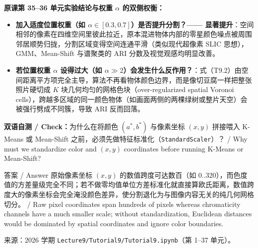 \textbf{原课第 35–36 单元实验结论与权重 $\alpha$ 的双侧权衡：}
\begin{itemize}
\item \textbf{加入适度位置权重（如 $\alpha \in [0.3, 0.7]$）是否提升分割？—— 显著提升}：空间相邻的像素在四维空间里彼此拉近，原本混进物体内部的零星颜色噪点被周围邻居顺势归拢，分割区域变得空间连通平滑（类似现代超像素 SLIC 思想），GMM、Mean-Shift 与谱聚类的 ARI 分数及视觉观感均明显改善。
\item \textbf{若位置权重 $\alpha$ 设得过大（如 $\alpha \gg 2$）会发生什么反作用？}：式（T9.2）由空间距离平方项完全主导，算法不再看物体颜色边界，而是像切豆腐一样把整张照片硬切成 $K$ 块几何均匀的网格色块（over-regularized spatial Voronoi cells），跨越多区域的同一颜色物体（如画面两侧的两棵绿树或整片天空）会被强行劈成不同簇，导致 ARI 反而回落。
\end{itemize}

\textbf{双语自测 / Check：}为什么在将颜色 $(a^*, b^*)$ 与像素坐标 $(x, y)$ 拼接喂入 K-Means 或 Mean-Shift 之前，必须先做特征标准化（\texttt{StandardScaler}）？ / Why must we standardize color and $(x,y)$ coordinates before running K-Means or Mean-Shift?

\begin{StudySolution}{答案 / Answer}
原始像素坐标 $(x, y)$ 的数值跨度可达数百（如 $0..320$），而色度值的方差量级完全不同；若不做零均值单位方差标准化就直接算欧氏距离，数值跨度大的像素坐标会完全淹没颜色差异，使分割退化为与图像内容无关的纯几何网格切分。 / Raw pixel coordinates span hundreds of pixels whereas chromaticity channels have a much smaller scale; without standardization, Euclidean distances would be dominated by spatial coordinates and ignore color boundaries.
\end{StudySolution}

来源：2026 学期 \texttt{Lecture9/Tutorial9/Tutorial9.ipynb}（第 1–37 单元）。
